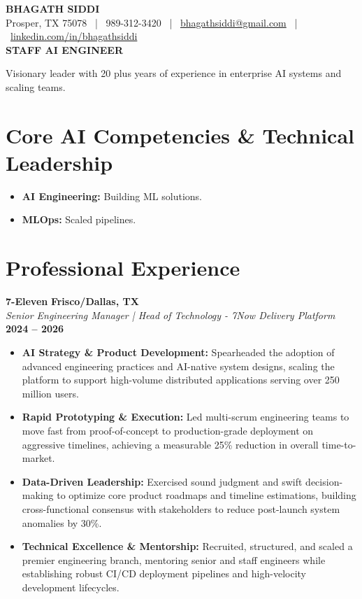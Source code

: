 \documentclass[9pt, letterpaper]{extarticle}
\begin{document}
\begin{center}
    {\huge \textbf{BHAGATH SIDDI}} \\
    \vspace{1pt}
    \small Prosper, TX 75078 \ | \ 989-312-3420 \ | \ \href{mailto:bhagathsiddi@gmail.com}{bhagathsiddi@gmail.com} \ | \ \href{https://www.linkedin.com/in/bhagathsiddi}{linkedin.com/in/bhagathsiddi} \\
    \vspace{2pt} 
    \textbf{\large STAFF AI ENGINEER}
\end{center}

\vspace{-6pt}
{
\small \centering
Visionary leader with 20 plus years of experience in enterprise AI systems and scaling teams.
\par}

\vfill %

\section{Core AI Competencies \& Technical Leadership}
\begin{itemize}
\item \textbf{AI Engineering:} Building ML solutions.
\item \textbf{MLOps:} Scaled pipelines.
\end{itemize}

\vfill

\section{Professional Experience}

\textbf{7-Eleven} \hfill \textbf{Frisco/Dallas, TX} \\
\textit{Senior Engineering Manager | Head of Technology - 7Now Delivery Platform} \hfill \textbf{2024 -- 2026}
\begin{itemize}
    \item \textbf{AI Strategy \& Product Development:} Spearheaded the adoption of advanced engineering practices and AI-native system designs, scaling the platform to support high-volume distributed applications serving over 250 million users.
    \item \textbf{Rapid Prototyping \& Execution:} Led multi-scrum engineering teams to move fast from proof-of-concept to production-grade deployment on aggressive timelines, achieving a measurable 25\% reduction in overall time-to-market.
    \item \textbf{Data-Driven Leadership:} Exercised sound judgment and swift decision-making to optimize core product roadmaps and timeline estimations, building cross-functional consensus with stakeholders to reduce post-launch system anomalies by 30\%.
    \item \textbf{Technical Excellence \& Mentorship:} Recruited, structured, and scaled a premier engineering branch, mentoring senior and staff engineers while establishing robust CI/CD deployment pipelines and high-velocity development lifecycles.
\end{itemize}
\end{document}
